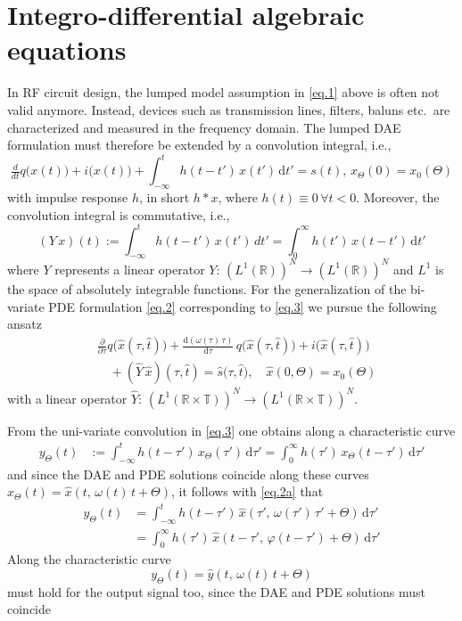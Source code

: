 \documentclass[journal]{IEEEtran}
\newcommand{\beq}{\begin{equation}}
\newcommand{\eeq}{ \end{equation} }
\newcommand{\no}{\nonumber}
\newcommand{\dbyd}[2]{\ensuremath{\tfrac{\mathrm{d} {#1}}{\mathrm{d}%
{#2}}}}
\newcommand{\R}{\ensuremath{\mathbb{R}}}
\newcommand{\TT}{\ensuremath{\mathbb{T}}}
\newcommand{\drm}{\ensuremath{\mathrm{d}}}
\newcommand{\htt}{\ensuremath{\hat{t}}}
\begin{document}
\section{Integro-differential algebraic equations}

In RF circuit design, the lumped model assumption in \eqref{eq.1} above is
often not valid anymore.
Instead, devices such as transmission lines, filters, baluns etc.\ are characterized and
measured in the frequency domain. The lumped DAE formulation must therefore be
extended by a convolution integral, i.e.,
\beq
\tfrac{d}{dt}q\big(x(t)\big)
        + i\big(x(t)\big) + \int_{-\infty}^t h(t-t')\,x(t')\,\drm t' = s(t),
        \, x_\Theta(0) = x_0(\Theta) \label{eq.3}
\eeq
with impulse response $h$, in short $h * x$, where $h(t)\equiv 0 \, \forall t<0$.
Moreover, the convolution integral is commutative, i.e.,
\[
 (Y\,x)(t) := \int_{-\infty}^t h(t-t')\,x(t')\,dt' = \int_0^{\infty} h(t')\,x(t-t')\,\drm t'
\]
where $Y$ represents a linear operator $Y: \,(L^1(\R))^N \rightarrow (L^1(\R))^N$ and
$L^1$ is the space of absolutely integrable functions.
For the generalization of the bi-variate PDE formulation \eqref{eq.2}
 corresponding to \eqref{eq.3} we pursue the following ansatz
\begin{align}
	&\tfrac{\partial}{\partial \tau} q\big(\hat{x}(\tau,\htt)\big)
	+\dbyd{(\omega(\tau)\,\tau)}{\tau}\,
	 q\big(\hat{x}(\tau,\htt)\big)
	+i\big(\hat{x}(\tau,\htt)\big) \no\\
	& \quad +   (\hat{Y}\,\hat{x})(\tau,\htt)
	    = \hat{s}\big(\tau,\htt\big), 
	\quad \hat{x}(0,\Theta) = x_0(\Theta) \label{eq.4}
\end{align}
with a linear operator $\hat{Y}: \,(L^1(\R \times \TT))^N \rightarrow (L^1(\R \times \TT))^N$.

From the uni-variate convolution in \eqref{eq.3} one obtains along a characteristic curve
\begin{align*}
    y_\Theta(t) &:= \int_{-\infty}^t h(t-\tau')\,x_\Theta(\tau')\,\drm \tau'
    = \int_0^\infty h(\tau')\,x_\Theta(t-\tau')\,\drm \tau'
\end{align*}
and since the DAE and PDE solutions coincide along these curves
$
 x_\Theta(t) = \hat{x}(t,\,\omega(t)\,t+\Theta)
$,
it follows with \eqref{eq.2a}  that
\begin{align*}
    y_\Theta(t) &= \int_{-\infty}^t h(t-\tau')\,
       \hat{x}(\tau',\,\omega(\tau')\,\tau'+\Theta)\,\drm \tau'\\
       &= \int_0^\infty h(\tau')\,\hat{x}(t-\tau',\,\varphi(t-\tau')+\Theta)\,\drm \tau'
\end{align*}
Along the characteristic curve
\[
 y_\Theta(t) = \hat{y}(t,\,\omega(t)\,t+\Theta)
\]
must hold for the output signal too, since the DAE and PDE solutions must coincide
\end{document}

